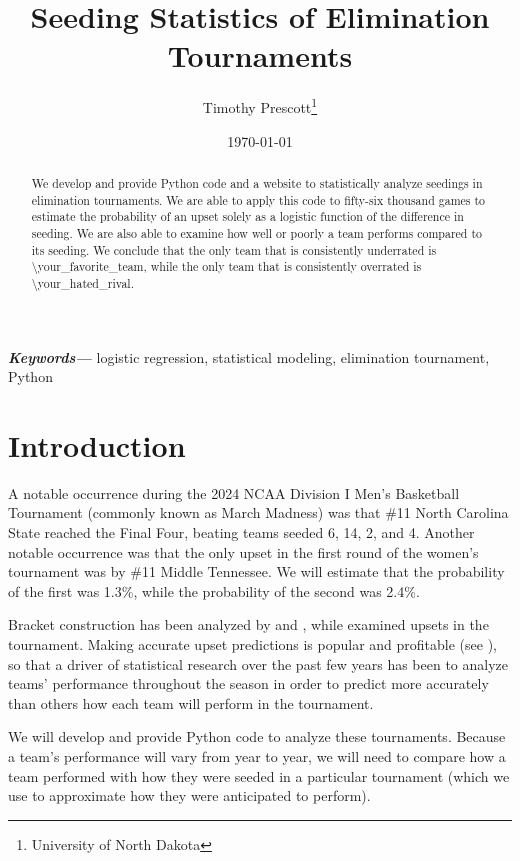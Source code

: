 \documentclass{article}
\title{Seeding Statistics of Elimination Tournaments}
\author{Timothy Prescott\footnote{University of North Dakota}}
\date{\today}
\begin{document}
\maketitle

\tableofcontents

\begin{abstract}
We develop and provide Python code and a website to statistically analyze seedings in elimination tournaments.  We are able to apply this code to fifty-six thousand games to estimate the probability of an upset solely as a logistic function of the difference in seeding.  We are also able to examine how well or poorly a team performs compared to its seeding.  We conclude that the only team that is consistently underrated is \textbackslash your\_favorite\_team, while the only team that is consistently overrated is \textbackslash your\_hated\_rival.
\end{abstract}

\noindent
{\small\textbf{\textit{Keywords---}} logistic regression, statistical modeling, elimination tournament, Python}

\section{Introduction}
A notable occurrence during the 2024 NCAA Division I Men's Basketball Tournament (commonly known as March Madness) was that \#11 North Carolina State reached the Final Four, beating teams seeded 6, 14, 2, and 4.  Another notable occurrence was that the only upset in the first round of the women's tournament was by \#11 Middle Tennessee.  We will estimate that the probability of the first was 1.3\%, while the probability of the second was 2.4\%.

Bracket construction has been analyzed by \cite{Schwenk} and \cite{Seltzer}, while \cite{Wittry} examined upsets in the tournament.  Making accurate upset predictions is popular and profitable (see \cite{Chartier}), so that a driver of statistical research over the past few years has been to analyze teams' performance throughout the season in order to predict more accurately than others how each team will perform in the tournament.

We will develop and provide Python code to analyze these tournaments.  Because a team's performance will vary from year to year, we will need to compare how a team performed with how they were seeded in a particular tournament (which we use to approximate how they were anticipated to perform).
\end{document}
